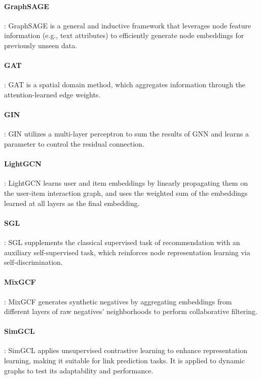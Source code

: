 \paragraph{GraphSAGE \cite{graphsage_reference}}: GraphSAGE is a general and inductive framework that leverages node feature information (e.g., text attributes) to efficiently generate node embeddings for previously unseen data.

\paragraph{GAT \cite{gat_reference}}: GAT is a spatial domain method, which aggregates information through the attention-learned edge weights.

\paragraph{GIN \cite{gin_reference}}: GIN utilizes a multi-layer perceptron to sum the results of GNN and learns a parameter to control the residual connection.

\paragraph{LightGCN \cite{lightgcn_reference}}: LightGCN learns user and item embeddings by linearly propagating them on the user-item interaction graph, and uses the weighted sum of the embeddings learned at all layers as the final embedding.

\paragraph{SGL \cite{sgl_reference}}: SGL supplements the classical supervised task of recommendation with an auxiliary self-supervised task, which reinforces node representation learning via self-discrimination.

\paragraph{MixGCF \cite{mixgcf_reference}}: MixGCF generates synthetic negatives by aggregating embeddings from different layers of raw negatives' neighborhoods to perform collaborative filtering.

\paragraph{SimGCL \cite{simgcl_reference}}: SimGCL applies unsupervised contrastive learning to enhance representation learning, making it suitable for link prediction tasks. It is applied to dynamic graphs to test its adaptability and performance.

